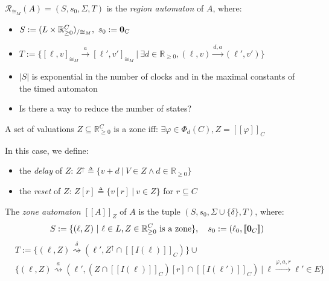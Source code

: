 \documentclass{beamer}
\theoremstyle{definition}
\newcommand{\xra}[1]{\overset{#1}{\rightsquigarrow}}
\begin{document}
\begin{frame}
\begin{definition}
  $\mathcal{R}_{\cong_M}(A) = (S, s_0, \Sigma, T)$ is the \emph{region automaton} of $A$, where:
  \begin{itemize}
    \item $S := (L \times \mathbb{R}_{\geq 0}^C)_{/\cong_M},\ s_0 := \text{\bf 0}_C$
    \item $T := \{[\ell, v]_{\cong_M} \xrightarrow{a} [\ell', v']_{\cong_M}\ |\ \exists d \in \mathbb{R}_{\geq 0}, (\ell, v) \xrightarrow{d, a} (\ell', v')\}$
  \end{itemize}
\end{definition}
\begin{itemize}
  \item<2> $\left| S \right|$ is exponential in the number of clocks and in the maximal constants of the timed automaton
  \item<2> Is there a way to reduce the number of states?
\end{itemize}
\end{frame}

\begin{frame}
  \begin{definition}[Zone]
    A set of valuations $Z \subseteq \mathbb{R}_{\geq 0}^C$ is a zone iff:
    $\exists \varphi \in \varPhi_d(C), Z = [\![\varphi]\!]_C$
    
    In this case, we define:
    \begin{itemize}
      \item the \emph{delay} of $Z$: $Z^\uparrow \triangleq \{ v + d \ |\ V \in Z \land d \in \mathbb{R}_{\geq 0}\}$
      \item the \emph{reset} of $Z$: $Z[r] \triangleq \{ v[r] \ |\ v \in Z\}$ for $r \subseteq C$
    \end{itemize}
  \end{definition}
  \small
  \begin{definition}
    The \emph{zone automaton} $[\![A]\!]_Z$ of $A$ is the tuple $(S, s_0, \Sigma \cup \{\delta\}, T)$, where:\\
      $$S := \{ (\ell, Z)\ |\ \ell \in L, Z \in \mathbb{R}_{\geq 0}^C\ \text{is a zone}\},\quad s_0 := (\ell_0, [\![\text{\bf 0}_C]\!])$$
    \begin{align*}
      &T := \{ (\ell, Z) \xra{\delta} (\ell', Z^\uparrow \cap [\![I(\ell)]\!]_C)\} \cup \\
      &\{ (\ell, Z) \xra{a} (\ell', (Z \cap [\![I(\ell)]\!]_C)[r] \cap [\![I(\ell')]\!]_C) \ |\ \ell \xrightarrow{\varphi, a, r} \ell' \in E\}
    \end{align*}
  \end{definition}
\end{frame}
\end{document}
